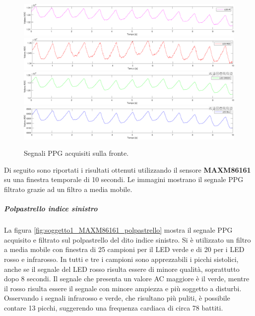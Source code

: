 \begin{figure}[h]
	\centering
	\includegraphics[width=1\linewidth]{ImageFiles/Misure Preliminari/Soggetto 1/MAX86916/fronte_ired}
	\includegraphics[width=1\linewidth]{ImageFiles/Misure Preliminari/Soggetto 1/MAX86916/fronte_red}
	\includegraphics[width=1\linewidth]{ImageFiles/Misure Preliminari/Soggetto 1/MAX86916/fronte_green}
	\includegraphics[width=1\linewidth]{ImageFiles/Misure Preliminari/Soggetto 1/MAX86916/fronte_blu}
	\caption{Segnali PPG acquisiti sulla fronte.}
	\label{fig:soggetto1_MAX86916_fronte}
\end{figure}

\clearpage

Di seguito sono riportati i risultati ottenuti utilizzando il sensore \textbf{MAXM86161} su una finestra temporale di 10 secondi. Le immagini mostrano il segnale PPG filtrato grazie ad un filtro a media mobile.

\subparagraph{Polpastrello indice sinistro}

La figura \ref{fig:soggetto1_MAXM86161_polpastrello} mostra il segnale PPG acquisito e filtrato sul polpastrello del dito indice sinistro. Si è utilizzato un filtro a media mobile con finestra di 25 campioni per il LED verde  e di 20 per i LED rosso e infrarosso. In tutti e tre i campioni sono apprezzabili i picchi sistolici, anche se il segnale del LED rosso risulta essere di minore qualità, soprattutto dopo 8 secondi. Il segnale che presenta un valore AC maggiore è il verde, mentre il rosso risulta essere il segnale con minore ampiezza e più soggetto a disturbi. Osservando i segnali infrarosso e verde, che risultano più puliti, è possibile contare 13 picchi, suggerendo una frequenza cardiaca di circa 78 battiti.

